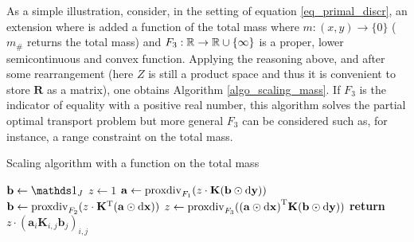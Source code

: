 As a simple illustration, consider, in the setting of equation \eqref{eq_primal_discr}, an extension where is added a function of the total mass
where $m:(x,y) \to \{0\}$ ($m_\#$ returns the total mass) and $F_3:\mathbb{R}\to \mathbb{R}\cup \{\infty\}$ is a proper, lower semicontinuous and convex function.
Applying the reasoning above, and after some rearrangement (here $Z$ is still a product space and thus it is convenient to store $\mathbf{R}$ as a matrix), one obtains Algorithm \ref{algo_scaling_mass}. If $F_{3}$ is the indicator of equality with a positive real number, this algorithm solves the partial optimal transport problem \cite{caffarelli2010free,figalli2010optimal} but more general $F_{3}$ can be considered such as, for instance, a range constraint on the total mass.

\begin{algorithm}
\caption{Scaling algorithm with a function on the total mass}\label{algo_scaling_mass}
\begin{algorithmic}[1]
   \State $\mathbf{b} \gets \ones_J$
   \State $z \gets 1$
   \Repeat
		\State $\mathbf{a} \gets \operatorname{proxdiv}_{F_1}(z\cdot \mathbf{K}(\mathbf{b} \odot \mathbf{\mathrm{d} y}))$
		\State  $\mathbf{b} \gets \operatorname{proxdiv}_{F_2}(z\cdot {\mathbf{K}}^{\mathrm{T}}(\mathbf{a} \odot \mathbf{\mathrm{d} x}))$
		\State  $z \gets \operatorname{proxdiv}_{F_3}({(\mathbf{a} \odot \mathbf{\mathrm{d} x})}^{\mathrm{T}}\mathbf{K}(\mathbf{b} \odot \mathbf{\mathrm{d} y}))$
   \State \textbf{return} $z\cdot(\mathbf{a}_i \mathbf{K}_{i,j} \mathbf{b}_j)_{i,j}$
\EndFunction
\end{algorithmic}
\end{algorithm}